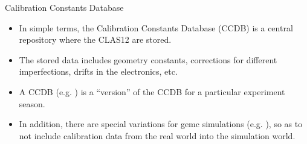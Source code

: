 \begin{frame}{Calibration Constants Database}
    \label{20.01::ccdb}
    \begin{itemize}
        \item
        \vspace{12pt}
        In simple terms, the Calibration Constants Database (CCDB) is a central repository where the CLAS12  are stored.
        \item
            The stored data includes geometry constants, corrections for different imperfections, drifts in the electronics, etc.

        \vspace{12pt}
        \item
            A CCDB  (e.g. ) is a ``version'' of the CCDB for a particular experiment season.

        \vspace{12pt}
        \item
            In addition, there are special variations for gemc simulations (e.g. ), so as to not include calibration data from the real world into the simulation world.
    \end{itemize}

\end{frame}
